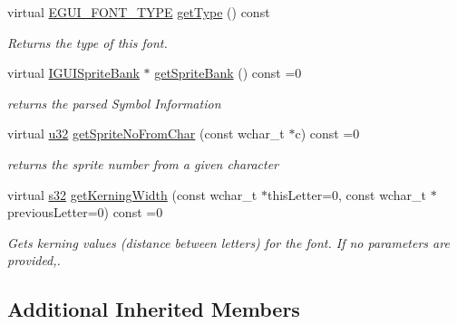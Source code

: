 \begin{DoxyCompactItemize}
\mbox{\label{classirr_1_1gui_1_1IGUIFontBitmap_a8e4b5d7d84a71fcfcf3cbb96663be332}} 
virtual \hyperlink{namespaceirr_1_1gui_a3c818a164486f43300260327c5420a2f}{E\+G\+U\+I\+\_\+\+F\+O\+N\+T\+\_\+\+T\+Y\+PE} \hyperlink{classirr_1_1gui_1_1IGUIFontBitmap_a8e4b5d7d84a71fcfcf3cbb96663be332}{get\+Type} () const
\begin{DoxyCompactList}\small\item\em Returns the type of this font. \end{DoxyCompactList}\item 
\mbox{\label{classirr_1_1gui_1_1IGUIFontBitmap_ab9185a0c2e708958a8caae7bdeba9deb}} 
virtual \hyperlink{classirr_1_1gui_1_1IGUISpriteBank}{I\+G\+U\+I\+Sprite\+Bank} $\ast$ \hyperlink{classirr_1_1gui_1_1IGUIFontBitmap_ab9185a0c2e708958a8caae7bdeba9deb}{get\+Sprite\+Bank} () const =0
\begin{DoxyCompactList}\small\item\em returns the parsed Symbol Information \end{DoxyCompactList}\item 
\mbox{\label{classirr_1_1gui_1_1IGUIFontBitmap_a3c717559574dd9e63b3d5869c9ee321d}} 
virtual \hyperlink{namespaceirr_a0416a53257075833e7002efd0a18e804}{u32} \hyperlink{classirr_1_1gui_1_1IGUIFontBitmap_a3c717559574dd9e63b3d5869c9ee321d}{get\+Sprite\+No\+From\+Char} (const wchar\+\_\+t $\ast$c) const =0
\begin{DoxyCompactList}\small\item\em returns the sprite number from a given character \end{DoxyCompactList}\item 
virtual \hyperlink{namespaceirr_ac66849b7a6ed16e30ebede579f9b47c6}{s32} \hyperlink{classirr_1_1gui_1_1IGUIFontBitmap_a7bdeaea45745a10e09f7769ec3b95a12}{get\+Kerning\+Width} (const wchar\+\_\+t $\ast$this\+Letter=0, const wchar\+\_\+t $\ast$previous\+Letter=0) const =0
\begin{DoxyCompactList}\small\item\em Gets kerning values (distance between letters) for the font. If no parameters are provided,. \end{DoxyCompactList}\end{DoxyCompactItemize}
\subsection*{Additional Inherited Members}



